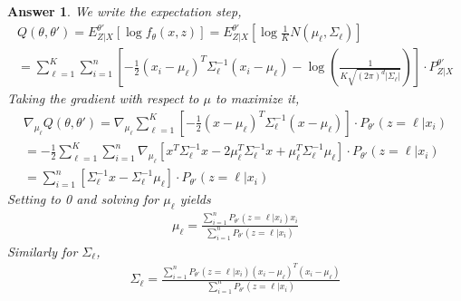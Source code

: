 \documentclass[12pt]{article}
\theoremstyle{colon}
\newtheorem*{answer}{Answer}
\begin{document}
\begin{answer}
  We write the expectation step,
  \begin{gather*}
    Q(\theta, \theta') = E_{Z|X}^{\theta'}[ \log f_\theta(x,z)] = E_{Z|X}^{\theta'}[ \log \frac{1}{K} N(\mu_\ell, \Sigma_\ell) ] \\
    = \sum_{\ell = 1}^K \sum_{i = 1}^n \left[ -\frac{1}{2}(x_i-\mu_\ell)^T \Sigma_\ell^{-1} (x_i-\mu_\ell) - \log \left(\frac{1}{K \sqrt{(2\pi)^d|\Sigma_\ell|}} \right) \right] \cdot P_{Z | X}^{\theta'}
  \end{gather*}
  Taking the gradient with respect to $\mu$ to maximize it,
  \begin{gather*}
    \nabla_{\mu_\ell} Q(\theta, \theta') = \nabla_{\mu_\ell} \sum_{\ell = 1}^K \left[ -\frac{1}{2}(x-\mu_\ell)^T \Sigma_\ell^{-1} (x-\mu_\ell) \right] \cdot P_{\theta'}(z = \ell | x_i) \\
    = -\frac{1}{2} \sum_{\ell = 1}^K \sum_{i = 1}^n \nabla_{\mu_\ell} \left[ x^T \Sigma_\ell^{-1} x - 2 \mu_\ell^T \Sigma_\ell^{-1} x + \mu_\ell^T \Sigma_\ell^{-1} \mu_\ell \right] \cdot P_{\theta'}(z = \ell | x_i) \\
    = \sum_{i = 1}^n [\Sigma_\ell^{-1} x - \Sigma_\ell^{-1} \mu_\ell] \cdot P_{\theta'}(z = \ell | x_i)
  \end{gather*}
  Setting to 0 and solving for $\mu_\ell$ yields
  \begin{gather*}
    \mu_\ell = \frac{\sum_{i = 1}^n P_{\theta'}(z = \ell | x_i) x_i }{\sum_{i = 1}^n P_{\theta'}(z = \ell | x_i)}
  \end{gather*}
  Similarly for $\Sigma_\ell$,
  \begin{gather*}
    \Sigma_\ell = \frac{\sum_{i = 1}^n P_{\theta'}(z = \ell | x_i) (x_i - \mu_\ell)^T(x_i - \mu_\ell) }{\sum_{i = 1}^n P_{\theta'}(z = \ell | x_i)}
  \end{gather*}
\end{answer}

\clearpage
\end{document}
